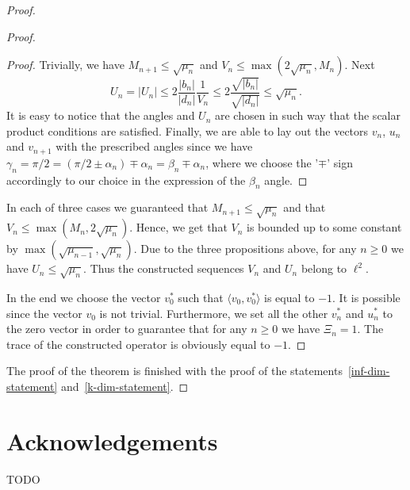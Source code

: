 \documentclass[12pt]{amsart}
\theoremstyle{case}
\begin{document}
\begin{proof}
\begin{proof}
\begin{proof}
            Trivially, we have $M_{n+1} \leq \sqrt{\mu_n}$ and $V_n \leq \max(2\sqrt{\mu_n}, M_n)$.
            Next
            \[
              U_n = |U_n| \leq 2 \frac{|b_n|}{|d_n|} \frac{1}{V_n} \leq 2 \frac{\sqrt{|b_n|}}{\sqrt{|d_n|}} \leq \sqrt{\mu_n}.
            \]
            It is easy to notice that the angles and $U_n$ are chosen in such way that the scalar product conditions are satisfied.
            Finally, we are able to lay out the vectors $v_n$, $u_n$ and $v_{n+1}$ with the prescribed angles 
              since we have $\gamma_n = \pi/2 = (\pi/2 \pm \alpha_n) \mp \alpha_n = \beta_n \mp \alpha_n$,
              where we choose the '$\mp$' sign accordingly to our choice in the expression of the $\beta_n$ angle.
          \end{proof}
        In each of three cases we guaranteed that $M_{n+1} \leq \sqrt{\mu_n}$ and
          that $V_n \leq \max(M_n, 2\sqrt{\mu_n})$.
        Hence, we get that $V_n$ is bounded up to some constant by $\max(\sqrt{\mu_{n-1}}, \sqrt{\mu_n})$.
        Due to the three propositions above, for any $n \geq 0$ we have $U_n \leq \sqrt{\mu_n}$.
        Thus the constructed sequences $V_n$ and $U_n$ belong to $\ell^2$.

        In the end we choose the vector $v_0^*$ such that $\langle v_0, v_0^*\rangle$ is equal to $-1$.
        It is possible since the vector $v_0$ is not trivial.
        Furthermore, we set all the other $v^*_n$ and $u^*_n$ to the zero vector in order to guarantee that for any $n \geq 0$ we have $\Xi_n = 1$.
        The trace of the constructed operator is obviously equal to $-1$.
      \end{proof}
      The proof of the theorem is finished with the proof of the statements~\ref{inf-dim-statement} and~\ref{k-dim-statement}.
    \end{proof}
  \section{Acknowledgements}
    TODO
    
\end{document}

